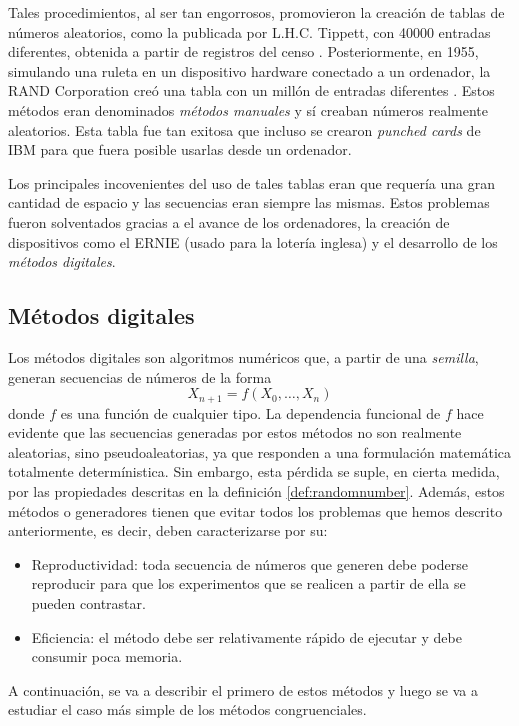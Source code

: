Tales procedimientos, al ser tan engorrosos, promovieron la creación de tablas de números aleatorios, como la publicada por L.H.C. Tippett, con 40000 entradas diferentes, obtenida a partir de registros del censo \cite{Tippett}. Posteriormente, en 1955, simulando una ruleta en un dispositivo hardware conectado a un ordenador, la RAND Corporation creó una tabla con un millón de entradas diferentes \cite{tukey1955million}. Estos métodos eran denominados \textit{métodos manuales} y sí creaban números realmente aleatorios. Esta tabla fue tan exitosa que incluso se crearon \textit{punched cards} de IBM para que fuera posible usarlas desde un ordenador.

Los principales incovenientes del uso de tales tablas eran que requería una gran cantidad de espacio y las secuencias eran siempre las mismas. Estos problemas fueron solventados gracias a el avance de los ordenadores, la creación de dispositivos como el ERNIE (usado para la lotería inglesa) y el desarrollo de los \textit{métodos digitales}.

\subsection{Métodos digitales}

Los métodos digitales son algoritmos numéricos que, a partir de una \textit{semilla}, generan secuencias de números de la forma 
\[
X_{n+1}=f(X_0, \ldots, X_n)
\]
donde $f$ es una función de cualquier tipo. La dependencia funcional de $f$ hace evidente que las secuencias generadas por estos métodos no son realmente aleatorias, sino pseudoaleatorias, ya que responden a una formulación matemática totalmente determínistica. Sin embargo, esta pérdida  se suple, en cierta medida, por las propiedades descritas en la definición \ref{def:randomnumber}. Además, estos métodos o generadores tienen que evitar todos los problemas que hemos descrito anteriormente, es decir, deben caracterizarse por su:

\begin{itemize}
\item Reproductividad: toda secuencia de números que generen debe poderse reproducir para que los experimentos que se realicen a partir de ella se pueden contrastar.
\item Eficiencia: el método debe ser relativamente rápido de ejecutar y debe consumir poca memoria.
\end{itemize}

A continuación, se va a describir el primero de estos métodos y luego se va a estudiar el caso más simple de los métodos congruenciales.

